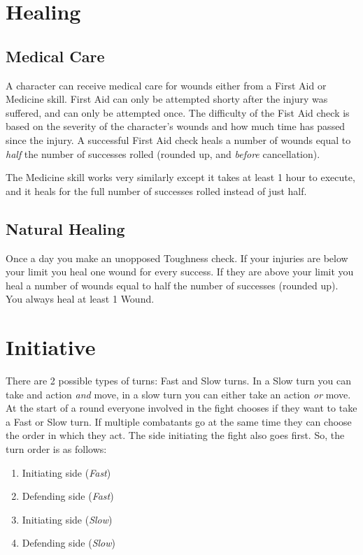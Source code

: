 \section{Healing}

\subsection{Medical Care}
A character can receive medical care for wounds either from a First Aid or Medicine skill.
First Aid can only be attempted shorty after the injury was suffered, and can only be attempted once.
The difficulty of the Fist Aid check is based on the severity of the character's wounds 
and how much time has passed since the injury.
A successful First Aid check heals a number of wounds equal to \textit{half} the number of successes rolled (rounded up, and \textit{before} cancellation).

The Medicine skill works very similarly except it takes at least 1 hour to execute,
and it heals for the full number of successes rolled instead of just half.

\subsection{Natural Healing}
Once a day you make an unopposed Toughness check. 
If your injuries are below your limit you heal one wound for every success. 
If they are above your limit you heal a number of wounds equal to half the number of successes (rounded up).
You always heal at least 1 Wound.

\section{Initiative}
There are 2 possible types of turns: Fast and Slow turns.  
In a Slow turn you can take and action \textit{and} move, in a slow turn you can either take an action \textit{or} move.  
At the start of a round everyone involved in the fight chooses if they want to take a Fast or Slow turn.
If multiple combatants go at the same time they can choose the order in which they act.
The side initiating the fight also goes first. So, the turn order is as follows: 

\begin{enumerate}
    \item Initiating side (\textit{Fast})
    \item Defending side (\textit{Fast})
    \item Initiating side (\textit{Slow})
    \item Defending side (\textit{Slow})
\end{enumerate}


